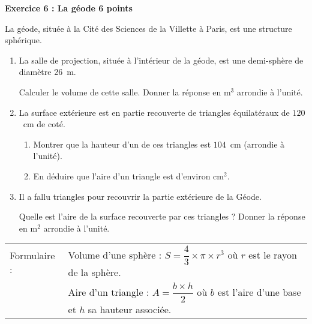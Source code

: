 \textbf{Exercice 6 : La géode \hfill 6 points}

\medskip

La géode, située à la Cité des Sciences de la Villette à Paris, est une
structure sphérique.

\medskip

\begin{enumerate}
\item La salle de projection, située à l'intérieur de la géode, est une
demi-sphère de diamètre 26~m.

Calculer le volume de cette salle. Donner la réponse en m$^3$ arrondie à l'unité.
\item La surface extérieure est en partie recouverte de triangles équilatéraux de $120$~cm de coté.
	\begin{enumerate}
		\item Montrer que la hauteur d'un de ces triangles est $104$~cm (arrondie à l'unité).
		\item En déduire que l'aire d'un triangle est d'environ cm$^2$.
 	\end{enumerate}
\item Il a fallu  triangles pour recouvrir la partie extérieure de la Géode.
	
Quelle est l'aire de la surface recouverte par ces triangles ? Donner la réponse en m$^2$ arrondie à l'unité.
\end{enumerate}

\medskip

\begin{tabularx}{\linewidth}{|l X|}\hline
Formulaire :& Volume d'une sphère : $S = \dfrac{4}{3} \times \pi \times r^3$ où $r$ est le rayon de la sphère.\rule[-3mm]{0mm}{9mm}\\
&Aire d'un triangle :  $A = \dfrac{b \times h}{2}$ où $b$ est l'aire d'une base et $h$ sa hauteur associée.\rule[-3mm]{0mm}{9mm}\\ \hline
\end{tabularx}

\vspace{0,5cm}

